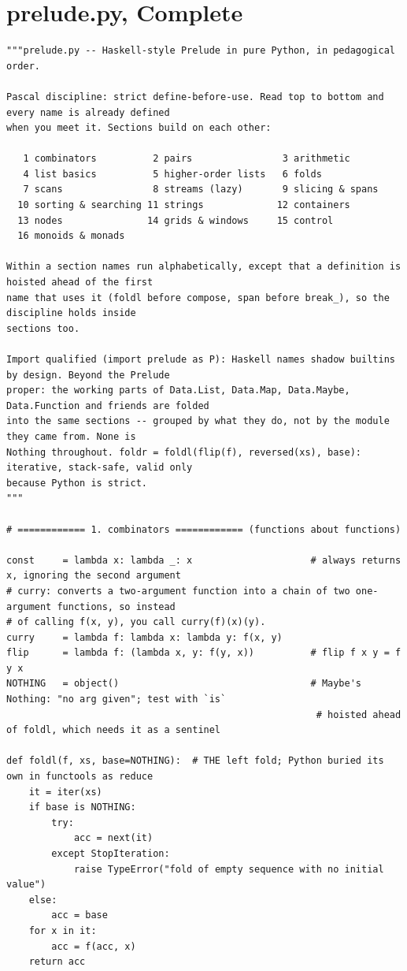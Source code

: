 \documentclass[10pt,letterpaper]{book}
\begin{document}
\chapter{prelude.py, Complete}
\begin{lstlisting}[style=file]
"""prelude.py -- Haskell-style Prelude in pure Python, in pedagogical order.

Pascal discipline: strict define-before-use. Read top to bottom and every name is already defined
when you meet it. Sections build on each other:

   1 combinators          2 pairs                3 arithmetic
   4 list basics          5 higher-order lists   6 folds
   7 scans                8 streams (lazy)       9 slicing & spans
  10 sorting & searching 11 strings             12 containers
  13 nodes               14 grids & windows     15 control
  16 monoids & monads

Within a section names run alphabetically, except that a definition is hoisted ahead of the first
name that uses it (foldl before compose, span before break_), so the discipline holds inside
sections too.

Import qualified (import prelude as P): Haskell names shadow builtins by design. Beyond the Prelude
proper: the working parts of Data.List, Data.Map, Data.Maybe, Data.Function and friends are folded
into the same sections -- grouped by what they do, not by the module they came from. None is
Nothing throughout. foldr = foldl(flip(f), reversed(xs), base): iterative, stack-safe, valid only
because Python is strict.
"""

# ============ 1. combinators ============ (functions about functions)

const     = lambda x: lambda _: x                     # always returns x, ignoring the second argument
# curry: converts a two-argument function into a chain of two one-argument functions, so instead
# of calling f(x, y), you call curry(f)(x)(y).
curry     = lambda f: lambda x: lambda y: f(x, y)
flip      = lambda f: (lambda x, y: f(y, x))          # flip f x y = f y x
NOTHING   = object()                                  # Maybe's Nothing: "no arg given"; test with `is`
                                                       # hoisted ahead of foldl, which needs it as a sentinel

def foldl(f, xs, base=NOTHING):  # THE left fold; Python buried its own in functools as reduce
    it = iter(xs)
    if base is NOTHING:
        try:
            acc = next(it)
        except StopIteration:
            raise TypeError("fold of empty sequence with no initial value")
    else:
        acc = base
    for x in it:
        acc = f(acc, x)
    return acc


\end{lstlisting}
\end{document}
